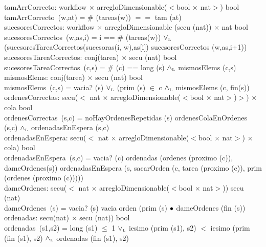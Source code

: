 \documentclass[a4paper,10pt]{article}
\begin{document}
	tamArrCorrecto: workflow $\times$ arregloDimensionable($<$bool $\times$ nat$>$) \en bool\\
	\indent tamArrCorrecto\ (w,at) =  $\#$ (tareas(w)) $==$ tam (at)\\
	
	sucesoresCorrectos: workflow $\times$ arregloDimensionable (secu (nat)) $\times$ nat \en bool\\
	\indent sucesoresCorrectos\ (w,as,i) =  i == $\#$ (tareas(w))  $\lor_{\mathrm{\scriptscriptstyle{L}}}$ (sucesoresTareaCorrectos(sucesoras(i, w),as[i])  \yluego sucesoresCorrectos (w,as,i+1)) \\
	
	sucesoresTareaCorrectos: conj(tarea) $\times$ secu (nat) \en bool\\
	\indent sucesoresTareaCorrectos\ (c,s) =  $\#$ (c) == long (s)  $\land_{\mathrm{\scriptscriptstyle{L}}}$ mismosElems (c,s) \\  
 
 	mismosElems: conj(tarea) $\times$ secu (nat) \en bool\\
	\indent mismosElems\ (c,s) =  vacia? (s) $\lor_{\mathrm{\scriptscriptstyle{L}}}$ (prim (s) $\in$ c $\land_{\mathrm{\scriptscriptstyle{L}}}$ mismosElems (c, fin(s)) \\  
		
		ordenesCorrectas: secu($<$ nat $\times$ arregloDimensionable($<$bool $\times$ nat$>$)$>$) $\times$ cola \en bool\\
	\indent ordenesCorrectas\ (s,c) =  noHayOrdenesRepetidas (s) \yluego ordenesColaEnOrdenes (s,c) $\land_{\mathrm{\scriptscriptstyle{L}}}$ ordenadasEnEspera (s,c)\\
	
	\newpage
	ordenadasEnEspera: secu($<$ nat $\times$ arregloDimensionable($<$bool $\times$ nat$>$) $\times$ cola) \en bool\\
	\indent ordenadasEnEspera\ (s,c) =  vacia? (c) \oluego ordenadas (ordenes (proximo (c)), dameOrdenes(s)) \yluego ordenadasEnEspera (s, sacarOrden (c, tarea (proximo (c)), prim (ordenes (proximo (c)))))\\
	
	dameOrdenes: secu($<$ nat $\times$ arregloDimensionable($<$bool $\times$ nat$>$)) \en secu (nat)\\
	\indent dameOrdenes\ (s) = \lif vacia? (s) \lthen vacia \lelse orden (prim (s) $\bullet$ dameOrdenes (fin (s))\\
	
	ordenadas: secu(nat) $\times$ secu (nat)) \en bool\\
	\indent ordenadas\ (s1,s2) =  long (s1) $\leq$ 1 $\lor_{\mathrm{\scriptscriptstyle{L}}}$ iesimo (prim (s1), s2) $<$ iesimo (prim (fin (s1), s2) $\land_{\mathrm{\scriptscriptstyle{L}}}$ ordenadas (fin (s1), s2)\\
	
\end{document}
